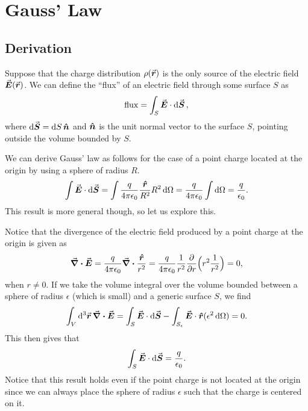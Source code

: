\chapter{Gauss' Law}

\section{Derivation}

Suppose that the charge distribution $\rho(\va*{r})$ is the only source of the electric field $\va*{E}(\va*{r})$.
We can define the ``flux'' of an electric field through some surface $S$ as
\begin{eqnarray}
    {\rm flux} = \int_{S} \va*{E} \cdot \dd{\va*{S}}
,\end{eqnarray}
where $\dd{\va*{S}} = \dd{S} \vu*{n}$ and $\vu*{n}$ is the unit normal vector to the surface $S$, pointing outside the volume bounded by $S$.

We can derive Gauss' law as follows for the case of a point charge located at the origin by using a sphere of radius $R$.
\begin{eqnarray}
    \int \va*{E} \cdot \dd{\va*{S}} = \int \frac{q}{4 \pi \epsilon_0} \frac{\vu*{r}}{R^2} R^2 \dd{\Omega} = \frac{q}{4 \pi \epsilon_0} \int \dd{\Omega} = \frac{q}{\epsilon_0}
.\end{eqnarray}
This result is more general though, so let us explore this.

Notice that the divergence of the electric field produced by a point charge at the origin is given as
\begin{eqnarray}
    \div{\va*{E}} = \frac{q}{4 \pi \epsilon_0} \div{\frac{\vu*{r}}{r^2}} = \frac{q}{4 \pi \epsilon_0} \frac{1}{r^2} \pdv{r} \Big( r^2 \frac{1}{r^2} \Big) = 0
,\end{eqnarray}
when $r \ne 0$.
If we take the volume integral over the volume bounded between a sphere of radius $\epsilon$ (which is small) and a generic surface $S$, we find
\begin{eqnarray}
    \int_{V} \dd[3]{\va*{r}} \div{\va*{E}} = \int_{S} \va*{E} \cdot \dd{\va*{S}} - \int_{S_{\epsilon}} \va*{E} \cdot \vu*{r} (\epsilon^2 \dd{\Omega}) = 0
.\end{eqnarray}
This then gives that
\begin{eqnarray}
    \int_{S} \va*{E} \cdot \dd{\va*{S}} = \frac{q}{\epsilon_0}
.\end{eqnarray}
Notice that this result holds even if the point charge is not located at the origin since we can always place the sphere of radius $\epsilon$ such that the charge is centered on it.

